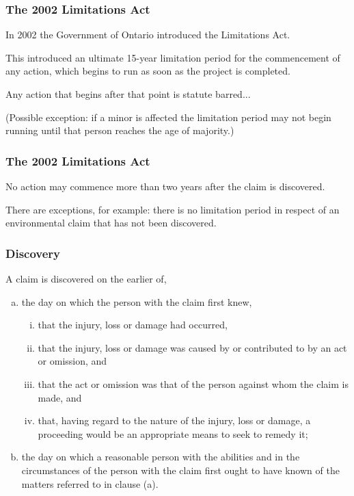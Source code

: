 \begin{frame}
\frametitle{The 2002 Limitations Act}

In 2002 the Government of Ontario introduced the Limitations Act.

This introduced an ultimate 15-year limitation period for the commencement of any action, which begins to run as soon as the project is completed.

Any action that begins after that point is statute barred...

(Possible exception: if a minor is affected the limitation period may not begin running until that person reaches the age of majority.)

\end{frame}



\begin{frame}
\frametitle{The 2002 Limitations Act}

No action may commence more than two years after the claim is discovered.

There are exceptions, for example: there is no limitation period in respect of an environmental claim that has not been discovered.

\end{frame}



\begin{frame}
\frametitle{Discovery}


A claim is discovered on the earlier of,
\begin{enumerate}[(a)]
	\item the day on which the person with the claim first knew,
		\begin{enumerate}[i.]
			\item that the injury, loss or damage had occurred,
			\item that the injury, loss or damage was caused by or contributed to by an act or omission, and
			\item that the act or omission was that of the person against whom the claim is made, and
			\item that, having regard to the nature of the injury, loss or damage, a proceeding would be an appropriate means to seek to remedy it;
		\end{enumerate}
	\item the day on which a reasonable person with the abilities and in the circumstances of the person with the claim first ought to have known of the matters referred to in clause (a).
\end{enumerate}

\end{frame}



